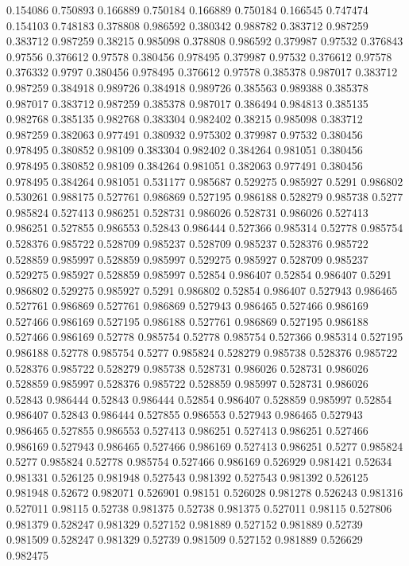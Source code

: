 0.154086 0.750893
0.166889 0.750184
0.166889 0.750184
0.166545 0.747474
0.154103 0.748183
0.378808 0.986592
0.380342 0.988782
0.383712 0.987259
0.383712 0.987259
0.38215 0.985098
0.378808 0.986592
0.379987 0.97532
0.376843 0.97556
0.376612 0.97578
0.380456 0.978495
0.379987 0.97532
0.376612 0.97578
0.376332 0.9797
0.380456 0.978495
0.376612 0.97578
0.385378 0.987017
0.383712 0.987259
0.384918 0.989726
0.384918 0.989726
0.385563 0.989388
0.385378 0.987017
0.383712 0.987259
0.385378 0.987017
0.386494 0.984813
0.385135 0.982768
0.385135 0.982768
0.383304 0.982402
0.38215 0.985098
0.383712 0.987259
0.382063 0.977491
0.380932 0.975302
0.379987 0.97532
0.380456 0.978495
0.380852 0.98109
0.383304 0.982402
0.384264 0.981051
0.380456 0.978495
0.380852 0.98109
0.384264 0.981051
0.382063 0.977491
0.380456 0.978495
0.384264 0.981051
0.531177 0.985687
0.529275 0.985927
0.5291 0.986802
0.530261 0.988175
0.527761 0.986869
0.527195 0.986188
0.528279 0.985738
0.5277 0.985824
0.527413 0.986251
0.528731 0.986026
0.528731 0.986026
0.527413 0.986251
0.527855 0.986553
0.52843 0.986444
0.527366 0.985314
0.52778 0.985754
0.528376 0.985722
0.528709 0.985237
0.528709 0.985237
0.528376 0.985722
0.528859 0.985997
0.528859 0.985997
0.529275 0.985927
0.528709 0.985237
0.529275 0.985927
0.528859 0.985997
0.52854 0.986407
0.52854 0.986407
0.5291 0.986802
0.529275 0.985927
0.5291 0.986802
0.52854 0.986407
0.527943 0.986465
0.527761 0.986869
0.527761 0.986869
0.527943 0.986465
0.527466 0.986169
0.527466 0.986169
0.527195 0.986188
0.527761 0.986869
0.527195 0.986188
0.527466 0.986169
0.52778 0.985754
0.52778 0.985754
0.527366 0.985314
0.527195 0.986188
0.52778 0.985754
0.5277 0.985824
0.528279 0.985738
0.528376 0.985722
0.528376 0.985722
0.528279 0.985738
0.528731 0.986026
0.528731 0.986026
0.528859 0.985997
0.528376 0.985722
0.528859 0.985997
0.528731 0.986026
0.52843 0.986444
0.52843 0.986444
0.52854 0.986407
0.528859 0.985997
0.52854 0.986407
0.52843 0.986444
0.527855 0.986553
0.527943 0.986465
0.527943 0.986465
0.527855 0.986553
0.527413 0.986251
0.527413 0.986251
0.527466 0.986169
0.527943 0.986465
0.527466 0.986169
0.527413 0.986251
0.5277 0.985824
0.5277 0.985824
0.52778 0.985754
0.527466 0.986169
0.526929 0.981421
0.52634 0.981331
0.526125 0.981948
0.527543 0.981392
0.527543 0.981392
0.526125 0.981948
0.52672 0.982071
0.526901 0.98151
0.526028 0.981278
0.526243 0.981316
0.527011 0.98115
0.52738 0.981375
0.52738 0.981375
0.527011 0.98115
0.527806 0.981379
0.528247 0.981329
0.527152 0.981889
0.527152 0.981889
0.52739 0.981509
0.528247 0.981329
0.52739 0.981509
0.527152 0.981889
0.526629 0.982475
